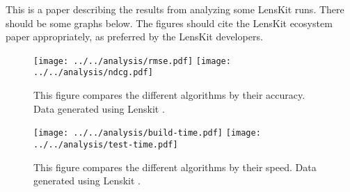 \documentclass{article}
\begin{document}
This is a paper describing the results from analyzing some LensKit
runs.  There should be some graphs below.  The figures should cite the
LensKit ecosystem paper appropriately, as preferred by the LensKit
developers. 

\begin{figure}
\begin{center}
\texttt{[image: ../../analysis/rmse.pdf]}
\texttt{[image: ../../analysis/ndcg.pdf]}
\caption{This figure compares the different algorithms by their
accuracy.  Data generated using Lenskit \cite{lenskit-ecosystem}.}
\end{center}
\end{figure}

\begin{figure}  
\begin{center}
\texttt{[image: ../../analysis/build-time.pdf]}
\texttt{[image: ../../analysis/test-time.pdf]}
\caption{This figure compares the different algorithms by their
speed.    Data generated using Lenskit \cite{lenskit-ecosystem}.}
\end{center}
\end{figure}



\end{document}
